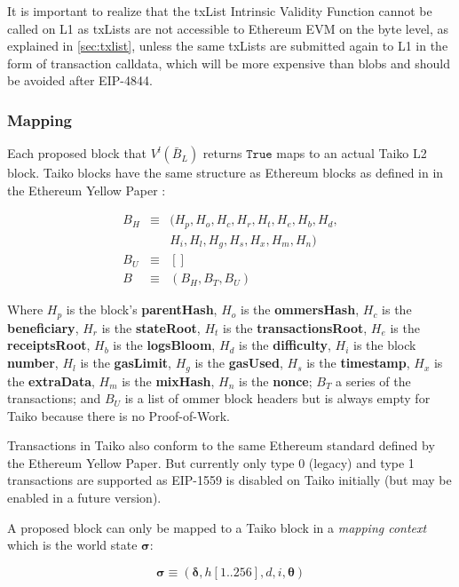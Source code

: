 \documentclass[9pt,oneside]{amsart}
\begin{document}
\begin{multicols}{2}
It is important to realize that the txList Intrinsic Validity Function cannot be called on L1 as txLists are not accessible to Ethereum EVM on the byte level, as explained in \ref{sec:txlist}, unless the same txLists are submitted again to L1 in the form of transaction calldata, which will be more expensive than blobs and should be avoided after EIP-4844.

\subsubsection{Mapping}

Each proposed block that $V^l(\bar{B}_L)$ returns $\texttt{True}$ maps to an actual Taiko L2 block. Taiko blocks have the same structure as Ethereum blocks as defined in in the Ethereum Yellow Paper \cite{ethyellowpaper}:

\begin{eqnarray}
B_H & \equiv & (H_p, H_o, H_c, H_r, H_t, H_e, H_b, H_d, \\
\nonumber & & H_i, H_l,H_g, H_s, H_x, H_m, H_n) \\
B_U  & \equiv & [] \\
B & \equiv & (B_H, B_T, B_U)
\end{eqnarray}

Where $H_p$ is the block's \textbf{parentHash}, $H_o$ is the \textbf{ommersHash}, $H_c$ is the \textbf{beneficiary}, $H_r$ is the \textbf{stateRoot}, $H_t$ is the \textbf{transactionsRoot}, $H_e$ is the \textbf{receiptsRoot}, $H_b$ is the \textbf{logsBloom}, $H_d$ is the \textbf{difficulty}, $H_i$ is the block \textbf{number}, $H_l$ is the \textbf{gasLimit}, $H_g$ is the \textbf{gasUsed}, $H_s$ is the \textbf{timestamp}, $H_x$ is the \textbf{extraData}, $H_m$ is the \textbf{mixHash}, $H_n$ is the \textbf{nonce}; $B_T$ a series of the transactions; and $B_U$ is a list of ommer block headers but is always empty for Taiko because there is no Proof-of-Work.

Transactions in Taiko also conform to the same Ethereum standard defined by the Ethereum Yellow Paper. But currently only type 0 (legacy) and type 1 transactions are supported as EIP-1559 is disabled on Taiko initially (but may be enabled in a future version).

A proposed block can only be mapped to a Taiko block in a \textit{mapping context} which is the world state $\boldsymbol{\sigma}$:

$$\boldsymbol{\sigma} \equiv (\boldsymbol{\delta}, h[1..256], d, i, \boldsymbol{\theta})$$


\end{multicols}
\end{document}
